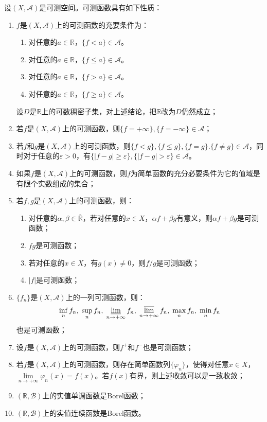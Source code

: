 \begin{property}\label{prop:MeasurableFunction}
	设$(X,\mathscr{A})$是可测空间。可测函数具有如下性质：
	\begin{enumerate}
		\item $f$是$(X,\mathscr{A})$上的可测函数的充要条件为：
		\begin{enumerate}
			\item 对任意的$a\in\mathbb{R}$，$\{f<a\}\in\mathscr{A}$。
			\item 对任意的$a\in\mathbb{R}$，$\{f\leqslant a\}\in\mathscr{A}$。
			\item 对任意的$a\in\mathbb{R}$，$\{f>a\}\in\mathscr{A}$。
			\item 对任意的$a\in\mathbb{R}$，$\{f\geqslant a\}\in\mathscr{A}$。
		\end{enumerate}
		设$D$是$\mathbb{R}$上的可数稠密子集，对上述结论，把$\mathbb{R}$改为$D$仍然成立；
		\item 若$f$是$(X,\mathscr{A})$上的可测函数，则$\{f=+\infty\},\{f=-\infty\}\in\mathscr{A}$；
		\item 若$f$和$g$是$(X,\mathscr{A})$上的可测函数，则$\{f<g\},\{f\leqslant g\},\{f=g\}.\{f\ne g\}\in\mathscr{A}$，同时对于任意的$\varepsilon>0$，有$\{|f-g|\geqslant\varepsilon\},\{|f-g|>\varepsilon\}\in \mathscr{A}$。
		\item 如果$f$是$(X,\mathscr{A})$上的可测函数，则$f$为简单函数的充分必要条件为它的值域是有限个实数组成的集合；
		\item 若$f,g$是$(X,\mathscr{A})$上的可测函数，则：
		\begin{enumerate}
			\item 对任意的$\alpha,\beta\in\overline{\mathbb{R}}$，若对任意的$x\in X$，$\alpha f+\beta g$有意义，则$\alpha f+\beta g$是可测函数；
			\item $fg$是可测函数；
			\item 若对任意的$x\in X$，有$g(x)\ne0$，则$f/g$是可测函数；
			\item $|f|$是可测函数；
		\end{enumerate}
		\item $\{f_n\}$是$(X,\mathscr{A})$上的一列可测函数，则：
		\begin{equation*}
			\inf_nf_n,\;\sup_nf_n,\;
			\varliminf_{n\to+\infty}f_n,\;\varlimsup_{n\to+\infty}f_n,\;\max_nf_n,\;\min_nf_n
		\end{equation*}
		也是可测函数；
		\item 设$f$是$(X,\mathscr{A})$上的可测函数，则$f^+$和$f^-$也是可测函数；
		\item 若$f$是$(X,\mathscr{A})$上的可测函数，则存在简单函数列$\{\varphi_n\}$，使得对任意$x\in X$，$\lim\limits_{n\to+\infty}\varphi_n(x)=f(x)$。若$f(x)$有界，则上述收敛可以是一致收敛；
		\item $(\mathbb{R},\mathcal{B})$上的实值单调函数是Borel函数；
		\item $(\mathbb{R},\mathcal{B})$上的实值连续函数是Borel函数。
	\end{enumerate}
\end{property}
